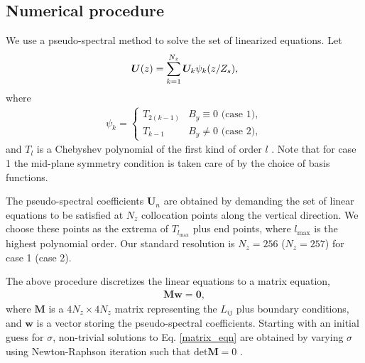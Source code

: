


\subsection{Numerical procedure}
We use a pseudo-spectral method to solve the set of linearized
equations. Let
\begin{align}\label{cheby_expand}
  \bm{U}(z) 
  = \sum_{k=1}^{N_z} \bm{U}_k\psi_k(z/Z_s), 
\end{align}
where 
\begin{align}
  \psi_k  = 
  \begin{cases}
    T_{2(k-1)} & B_y \equiv 0 \text{ (case 1)},\\
    T_{k-1}   & B_y\neq 0 \text{ (case 2)},
  \end{cases}
\end{align}
and  $T_l$ is a Chebyshev polynomial of the first kind of order $l$
\citep{stegun65}. Note that for case 1 the mid-plane symmetry condition
is taken care of by the choice of basis functions. 

The pseudo-spectral coefficients $\bm{U}_n$  are obtained by demanding
the set of linear equations to be satisfied at $N_z$ collocation
points along the vertical direction. We choose these points as the
extrema of $T_{l_\mathrm{max}}$ plus end points, where
$l_\mathrm{max}$ is the highest polynomial order. Our standard
resolution is $N_z=256$ ($N_z=257$) for case 1 (case 2).   

The above procedure discretizes the linear equations to a matrix equation,
\begin{align}\label{matrix_eqn}
\bm{M}\bm{w} = \mathbf{0}, 
\end{align}
where $\bm{M}$ is a $4N_z\times 4 N_z$ matrix representing the $L_{ij}$ 
plus boundary conditions, 
and $\bm{w}$ is a vector storing the pseudo-spectral coefficients. 
Starting with an initial guess for $\sigma$, non-trivial solutions to
Eq. \ref{matrix_eqn} are obtained by varying $\sigma$ using Newton-Raphson iteration 
such that $\mathrm{det}\bm{M}=0$ \citep[details can be found in][]{lin12}.



